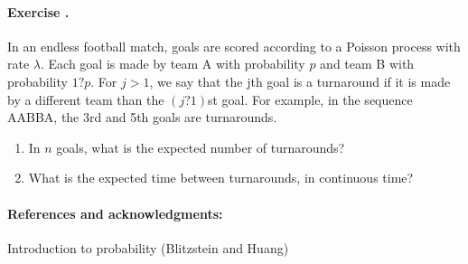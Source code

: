 \documentclass[12pt,a4paper]{article}
\newcounter{num}  %
\begin{document}
	
	\paragraph{Exercise \thenum.}
	In an endless football match, goals are scored according to a Poisson process with rate $\lambda$.
	Each goal is made by team A with probability $p$ and team B with probability $1 ? p$. 
	For $j > 1$, we say that the jth goal is a turnaround if it is made by a different team than the $(j ? 1)$st goal. 
	For example, in the sequence AABBA, the 3rd and 5th goals are
	turnarounds.
	\begin{enumerate}
		\item In $n$ goals, what is the expected number of turnarounds?
		\item What is the expected time between turnarounds, in continuous time?
	\end{enumerate}
	
	
	
	\paragraph{References and acknowledgments:} Introduction to probability (Blitzstein and Huang) 
\end{document}
